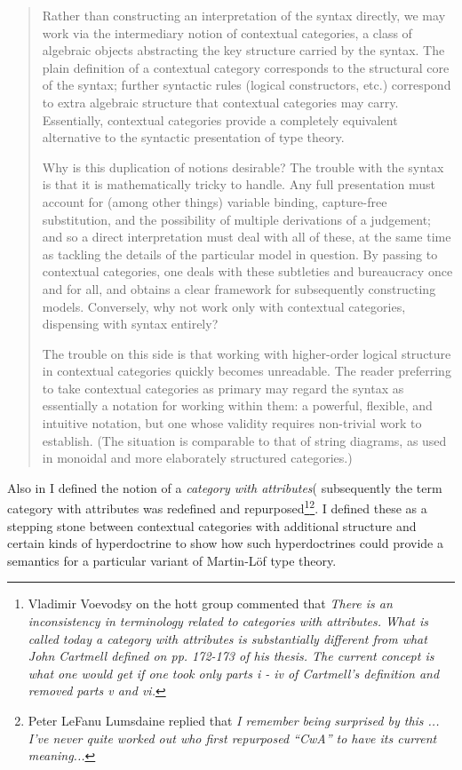 \documentclass[10pt,a4paper]{article}
\begin{document}
\begin{quote}
Rather than constructing an interpretation of the syntax directly, we may work via the intermediary notion of contextual categories, a class of algebraic objects abstracting the key structure carried by the syntax. The plain definition of a contextual category corresponds to the structural core of the syntax; further syntactic rules (logical constructors, etc.) correspond to extra algebraic structure that contextual categories may carry. Essentially, contextual categories provide a completely equivalent alternative to the syntactic presentation of type theory.

Why is this duplication of notions desirable? The trouble with the syntax is that it is mathematically tricky to handle. Any full presentation must account for (among other things) variable binding, capture-free substitution, and the possibility of multiple derivations of a judgement; and so a direct interpretation must deal with all of these, at the same time as tackling the details of the particular model in question. By passing to contextual categories, one deals with these subtleties and bureaucracy once and for all, and obtains a clear framework for subsequently constructing models. Conversely, why not work only with contextual categories, dispensing with syntax entirely?

The trouble on this side is that working with higher-order logical structure in contextual categories quickly becomes unreadable. The reader preferring to take contextual categories as primary may regard the syntax as essentially a notation for working within them: a powerful, flexible, and intuitive notation, but one whose validity requires non-trivial work to establish. (The situation is comparable to that of string diagrams, as used in monoidal and more elaborately structured categories.)
\end{quote}

\noindent
Also in \cite{Cartmell78} I defined the notion of a \textit{category with attributes}(
subsequently the term category with attributes was redefined and repurposed\footnote{Vladimir Voevodsy on the hott group commented 
that \textit {There is an inconsistency in terminology related to categories with attributes. 
What is called today a category with attributes is substantially different from what John Cartmell defined on pp. 172-173 of his thesis. The current concept is what one would get if one took only parts i - iv of Cartmell's definition and removed parts v and vi.}}\footnote{Peter LeFanu Lumsdaine replied that \textit{
I remember being surprised  by this ... I’ve never quite worked out who first repurposed “CwA” to have its current meaning...}}.
I defined these as a stepping stone between contextual categories with additional structure and certain kinds of hyperdoctrine to show how such hyperdoctrines could provide a semantics for
a particular variant of Martin-L\"of type theory.  
\end{document}
